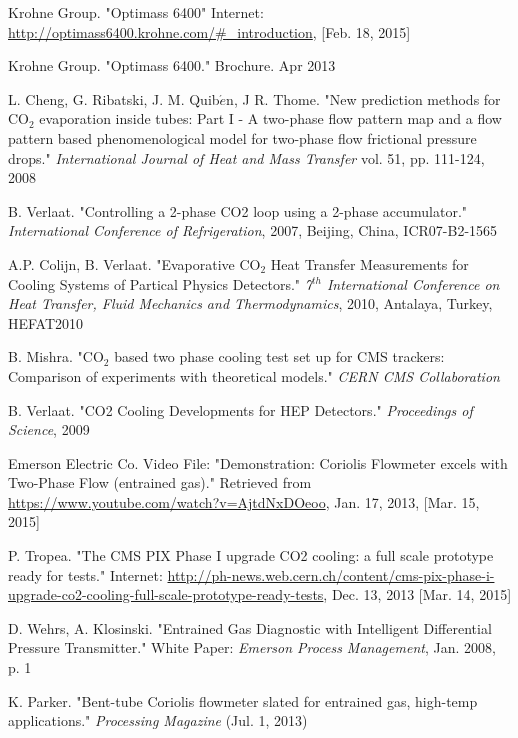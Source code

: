 \documentclass{report}
\begin{document}
\begin{thebibliography}{9}
Krohne Group. "Optimass 6400" Internet: \underline{http://optimass6400.krohne.com/\#\_introduction}, [Feb. 18, 2015]

Krohne Group. "Optimass 6400." Brochure. Apr 2013

L. Cheng, G. Ribatski, J. M. Quib$\acute{e}$n, J R. Thome. "New prediction methods for CO$_2$ evaporation inside tubes: Part I - A two-phase flow pattern map and a flow pattern based phenomenological model for two-phase flow frictional pressure drops." \textit{International Journal of Heat and Mass Transfer} vol. 51, pp. 111-124, 2008

B. Verlaat. "Controlling a 2-phase CO2 loop using a 2-phase accumulator." \textit{International Conference of Refrigeration}, 2007, Beijing, China, ICR07-B2-1565 

A.P. Colijn, B. Verlaat. "Evaporative CO$_2$ Heat Transfer Measurements for Cooling Systems of Partical Physics Detectors." \textit{7$^{
th}$ International Conference on Heat Transfer, Fluid Mechanics and Thermodynamics}, 2010, Antalaya, Turkey, HEFAT2010 

B. Mishra. "CO$_2$ based two phase cooling test set up for CMS trackers: Comparison of experiments with theoretical models." \textit{CERN CMS Collaboration}

B. Verlaat. "CO2 Cooling Developments for HEP Detectors." \textit{Proceedings of Science}, 2009

Emerson Electric Co. Video File: "Demonstration: Coriolis Flowmeter excels with Two-Phase Flow (entrained gas)." Retrieved from \underline{https://www.youtube.com/watch?v=AjtdNxDOeoo}, Jan. 17, 2013, [Mar. 15, 2015]

P. Tropea. "The CMS PIX Phase I upgrade CO2 cooling: a full scale prototype ready for tests." Internet: \underline{http://ph-news.web.cern.ch/content/cms-pix-phase-i-upgrade-co2-cooling-full-scale-prototype-ready-tests}, Dec. 13, 2013 [Mar. 14, 2015] 

D. Wehrs, A. Klosinski. "Entrained Gas Diagnostic with Intelligent Differential Pressure Transmitter." White Paper: \textit{Emerson Process Management}, Jan. 2008, p. 1

K. Parker. "Bent-tube Coriolis flowmeter slated for entrained gas, high-temp applications." \textit{Processing Magazine} (Jul. 1, 2013)


\end{thebibliography}
\end{document}
